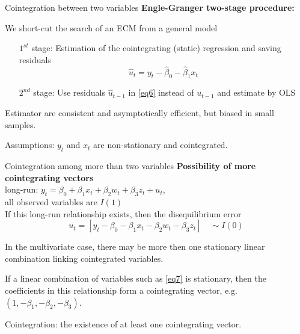 \documentclass{beamer}
\begin{document}

\begin{frame}{Cointegration between two variables}
\textbf{Engle-Granger two-stage procedure:}

\medskip
We short-cut the search of an ECM from a general model
\begin{itemize}
\item[ $1^{st}$ ]  stage: Estimation of the cointegrating (static) regression and saving residuals $$\hat{u}_t = y_t - \hat{\beta}_0 - \hat{\beta}_1 x_t$$
\item [$2^{nd}$]  stage: Use residuals $\hat{u}_{t-1}$ in \eqref{eq6} instead of $u_{t-1}$ and estimate by OLS
\end{itemize}
Estimator are consistent and asymptotically efficient, but biased in small samples. 

\medskip
\small{Assumptions: $y_t$ and $x_t$ are non-stationary and cointegrated.}
\end{frame}


\begin{frame}{Cointegration among more than two variables}
\textbf{Possibility of more cointegrating vectors}\\
long-run: $y_t= \beta_0 + \beta_1 x_t + \beta_2 w_t + \beta_3 z_t + u_t$,\\ all observed variables are $I(1)$\\
\medskip
If this long-run relationship exists, then the disequilibrium error \\
\begin{equation}  \label{eq7}
u_t= [y_t - \beta_0 - \beta_1 x_t - \beta_2 w_t - \beta_3 z_t ]
\quad \sim I(0) 
\end{equation} 

\vspace{0.3cm}
In the multivariate case, there may be more then one stationary linear combination linking cointegrated variables. 

\vspace{0.3cm}
If a linear combination of variables such as \eqref{eq7} is stationary, then the coefficients in this relationship form a cointegrating vector, e.g. $(1,-\beta_{1},-\beta_{2},-\beta_{3})$. 

\vspace{0.3cm} 
Cointegration: the existence of at least one cointegrating vector.

\end{frame}
\end{document}
